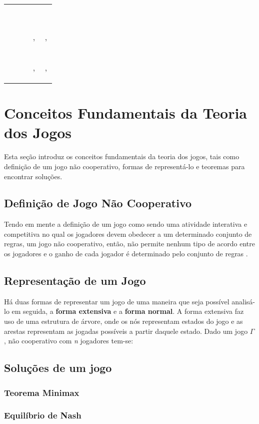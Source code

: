 \begin{tabular}{|c|c|c|c|}
\cline{3-4}
\multicolumn{1}{c}{} &  & \multicolumn{2}{c|}{\color{red}{Player 2}}\tabularnewline
\cline{3-4}
\multicolumn{1}{c}{} &  & \color{red}{Quieto}\  & \color{red}{Confessa}\ \tabularnewline
\hline
\multirow{2}{*}{\begin{turn}{90}
\color{blue}{Player 1}\
\end{turn}} & \begin{turn}{90}
\color{blue}{Quieto}\
\end{turn} & \color{blue}{-1},\color{red}{-1} & \color{blue}{-12},\color{red}{0}\tabularnewline
\cline{2-4}
 & \begin{turn}{90}
\color{blue}{Confessa}\
\end{turn} & \color{blue}{0},\color{red}{-12} & \color{blue}{-8},\color{red}{-8}\tabularnewline
\hline
\end{tabular}


\section{Conceitos Fundamentais da Teoria dos Jogos}
\label{sec:conceitos-fundamentais-da-teoria-dos-jogos}

Esta seção introduz os conceitos fundamentais da teoria dos jogos, tais como definição de um jogo não cooperativo, formas de representá-lo e teoremas para encontrar soluções.

\subsection{Definição de Jogo Não Cooperativo}
\label{subsec:definicao-de-jogo-nao-cooperativo}

Tendo em mente a definição de um jogo como sendo uma atividade interativa e competitiva no qual os jogadores devem obedecer a um determinado conjunto de regras, um jogo não cooperativo, então, não permite nenhum tipo de acordo entre os jogadores e o ganho de cada jogador é determinado pelo conjunto de regras \cite{jones_1980}.


\subsection{Representação de um Jogo}
\label{subsec:representacao-de-um-jogo}

Há duas formas de representar um jogo de uma maneira que seja possível analisá-lo em seguida, a \textbf{forma extensiva} e a \textbf{forma normal}. A forma extensiva faz uso de uma estrutura de árvore, onde os nós representam estados do jogo e as arestas representam as jogadas possíveis a partir daquele estado. Dado um jogo $\Gamma$, não cooperativo com \emph{n} jogadores tem-se:




\subsection{Soluções de um jogo}
\label{sec:solucoes-de-um-jogo}

\subsubsection{Teorema Minimax}
\label{subsubsec:teorema-minimax}

\subsubsection{Equilíbrio de Nash}
\label{subsubsec:equilibrio-de-nash}
